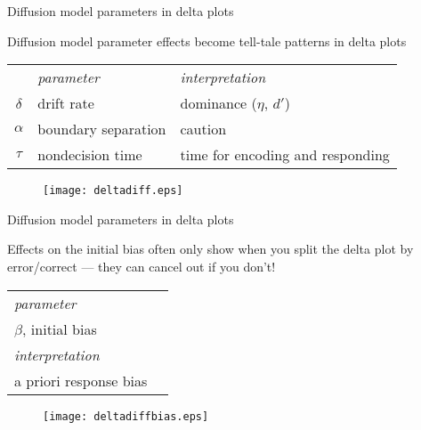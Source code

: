 \documentclass[aspectratio=169]{beamer}
\begin{document}
\begin{frame}[fragile]{Diffusion model parameters in delta plots}

Diffusion model parameter effects become tell-tale patterns in delta plots\\[4ex]

 \centering
\begin{tabular}{cll}
\rowcolor{black}
           & {\it\color{white}parameter} &  {\it\color{white}interpretation} \\
\rowcolor{verylightgray}
$\delta$   &  drift rate              &  dominance ($\eta$, $d'$) \\
\rowcolor{lightgray}
$\alpha$   &  boundary separation     &  caution \\
\rowcolor{verylightgray}
$\tau$     &  nondecision time        &  time for encoding and responding
\end{tabular}

\begin{figure}[htp]
\centering\vspace{-2ex}
\texttt{[image: deltadiff.eps]}
\end{figure}

\end{frame}



\begin{frame}[fragile]{Diffusion model parameters in delta plots}

Effects on the initial bias often only show when you split the delta plot by error/correct --- they can cancel out if you don't!\\[4ex]

 \centering
\begin{minipage}{.35\textwidth}
\begin{tabular}{ll}
\cellcolor{black}         {\it\color{white}parameter}      \\ 
\cellcolor{verylightgray} $\beta$, initial bias  \\
\cellcolor{black}         {\it\color{white}interpretation} \\ 
\cellcolor{verylightgray} a priori response bias  \\
\end{tabular}
\end{minipage}
\begin{minipage}{.6\textwidth}
\begin{figure}[htp]
\centering
\texttt{[image: deltadiffbias.eps]}
\end{figure}
\end{minipage}

\end{frame}
\end{document}
